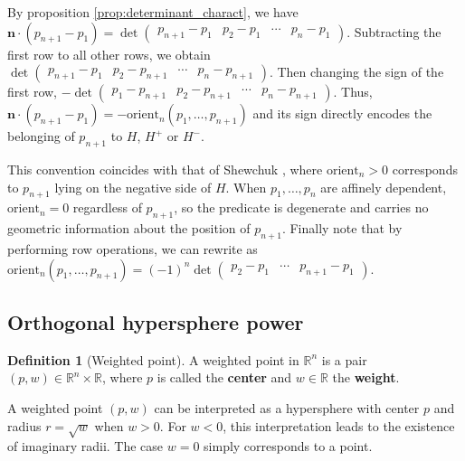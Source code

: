 \documentclass[12pt]{article}
\makeatletter
\theoremstyle{definition}
\newtheorem{definition}[theorem]{Definition}
\theoremstyle{remark}
\renewenvironment{proof}[1][\proofname]{\par
  \pushQED{\qed}%
  \normalfont \footnotesize \topsep6\p@\@plus6\p@\relax
  \list{}{\leftmargin=2em
          \settowidth{\itemindent}{\itshape#1}%
          \labelwidth=\itemindent
          \parsep=0pt \listparindent=\parindent 
  }
  \item[\hskip\labelsep
        \itshape
    #1\@addpunct{.}]\ignorespaces
}{%
  \popQED\endlist\@endpefalse
}
\makeatother
\begin{document}
\begin{proof}
    By proposition \ref{prop:determinant_charact}, we have $\mathbf{n} \cdot (p_{n+1}-p_{1}) = \det 
\left( \begin{array}{c|c|c|c}
        p_{n+1}-p_1 & p_2 - p_1 & \cdots & p_{n} - p_1
\end{array} \right)$.
Subtracting the first row to all other rows, we obtain 
$\det 
\left( \begin{array}{c|c|c|c}
        p_{n+1}-p_1 & p_2 - p_{n+1} & \cdots & p_{n} - p_{n+1}
\end{array} \right)$.
Then changing the sign of the first row, $-\det 
\left( \begin{array}{c|c|c|c}
        p_{1}-p_{n+1} & p_2 - p_{n+1} & \cdots & p_{n} - p_{n+1}\end{array} \right)$.
Thus, $\mathbf{n} \cdot (p_{n+1}-p_{1}) = - \mathrm{orient}_n \left(p_1, \ldots, p_{n+1} \right)$ and its sign directly encodes the belonging of $p_{n+1}$ to $H$, $H^+$ or $H^-$.
\end{proof}

This convention coincides with that of Shewchuk \cite{shewchuk1997adaptive}, where $\mathrm{orient}_n > 0$ corresponds to $p_{n+1}$ lying on the negative side of $H$. When $p_1, \ldots, p_n$ are affinely dependent, $\mathrm{orient}_n = 0$ regardless 
of $p_{n+1}$, so the predicate is degenerate and carries no geometric information about the position of $p_{n+1}$. 
Finally note that by performing row operations, we can rewrite as $\mathrm{orient}_{n}(p_1, \ldots, p_{n+1}) = (-1)^n \det 
\left( \begin{array}{c|c|c}
        p_2 - p_{1} & \cdots & p_{n+1} - p_{1} 
\end{array} \right)$.



\subsection{Orthogonal hypersphere power}
\begin{definition}[Weighted point]
A weighted point in $\mathbb{R}^n$ is a pair $(p, w) \in \mathbb{R}^n \times 
\mathbb{R}$, where $p$ is called the \textbf{center} and $w \in \mathbb{R}$ the 
\textbf{weight}.
\end{definition}

A weighted point $(p, w)$ can be interpreted as a hypersphere with center $p$ and radius $r = \sqrt{w}$ when $w > 0$. For $w < 0$, this interpretation leads to the existence of imaginary radii. The case $w=0$ simply corresponds to a point.
\end{document}
